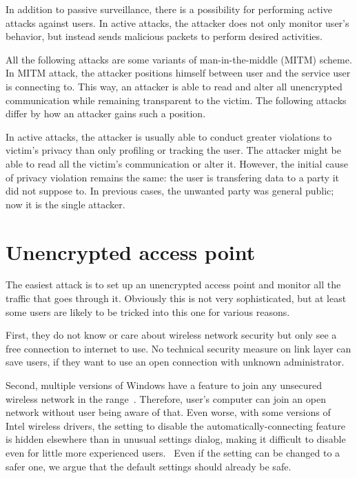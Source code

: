 \documentclass[12pt,a4paper,oneside,pdftex]{report}
\begin{document}
In addition to passive surveillance, there is a possibility for performing active attacks against users. In active attacks, the attacker does not only monitor user's behavior, but instead sends malicious packets to perform desired activities. 

All the following attacks are some variants of man-in-the-middle (MITM) scheme. In MITM attack, the attacker positions himself between user and the service user is connecting to. This way, an attacker is able to read and alter all unencrypted communication while remaining transparent to the victim. The following attacks differ by how an attacker gains such a position.

In active attacks, the attacker is usually able to conduct greater violations to victim's privacy than only profiling or tracking the user. The attacker might be able to read all the victim's communication or alter it. However, the initial cause of privacy violation remains the same: the user is transfering data to a party it did not suppose to. In previous cases, the unwanted party was general public; now it is the single attacker.

\section{Unencrypted access point}
\label{sec:attack_unencrypted}

The easiest attack is to set up an unencrypted access point and monitor all the traffic that goes through it. Obviously this is not very sophisticated, but at least some users are likely to be tricked into this one for various reasons.

First, they do not know or care about wireless network security but only see a free connection to internet to use. No technical security measure on link layer can save users, if they want to use an open connection with unknown administrator.

Second, multiple versions of Windows have a feature to join any unsecured wireless network in the range~\cite{dai2005attacking,windows_wifi_answers,superuser_win7wlan}. Therefore, user's computer can join an open network without user being aware of that. Even worse, with some versions of Intel wireless drivers, the setting to disable the automatically-connecting feature is hidden elsewhere than in unusual settings dialog, making it difficult to disable even for little more experienced users.~\cite{windows_wifi_answers,superuser_win7wlan} Even if the setting can be changed to a safer one, we argue that the default settings should already be safe.
\end{document}
